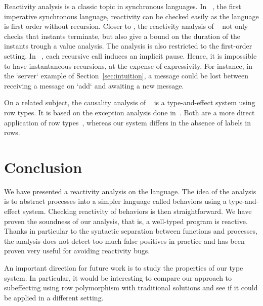 \documentclass[9pt,preprint]{sigplanconf}
\begin{document}
Reactivity analysis is a classic topic in synchronous languages. In \esterel~\cite{Berry:1997}, the first imperative synchronous language, reactivity can be checked easily as the language is first order without recursion. Closer to \rml, the reactivity analysis of \funloft~\cite{Amadio:2007b} not only checks that instants terminate, but also give a bound on the duration of the instants trough a value analysis. The analysis is also restricted to the first-order setting. In \ulm~\cite{Boudol:2004}, each recursive call induces an implicit pause. Hence, it is impossible to have instantaneous recursions, at the expense of expressivity. For instance, in the `server` example of Section~\ref{sec:intuition}, a message could be lost between receiving a message on `add` and awaiting a new message.

On a related subject, the causality analysis of \lucy~\cite{Cuoq:2001} is a type-and-effect system using row types. It is based on the exception analysis done in~\cite{Leroy:2000}. Both are a more direct application of row types~\cite{Remy:1993}, whereas our system differs in the absence of labels in rows.


\section{Conclusion}

We have presented a reactivity analysis on the \rml language. The idea of the analysis is to abstract processes into a simpler language called behaviors using a type-and-effect system. Checking reactivity of behaviors is then straightforward. We have proven the soundness of our analysis, that is, a well-typed program is reactive. Thanks in particular to the syntactic separation between functions and processes, the analysis does not detect too much false positives in practice and has been proven very useful for avoiding reactivity bugs.

An important direction for future work is to study the properties of our type system. In particular, it would be interesting to compare our approach to subeffecting using row polymorphism with traditional solutions and see if it could be applied in a different setting.
%
%



\begin{small}

\end{small}
\end{document}
